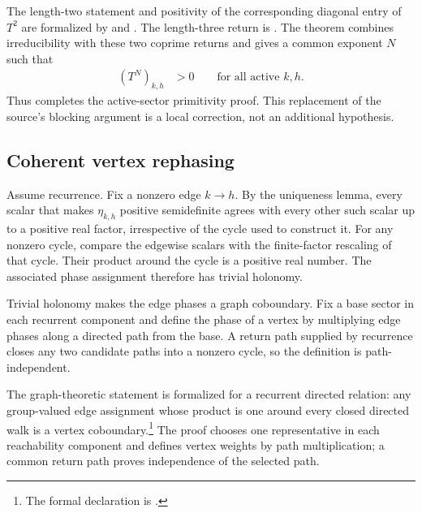 \documentclass{article}
\begin{document}
The length-two statement and positivity of the corresponding diagonal entry
of $T^2$ are formalized by
 and
.
The length-three return is
.
The theorem
combines irreducibility with these two coprime returns and gives a common
exponent $N$ such that
\begin{align}
    (T^N)_{k,h}
        &>0
        \qquad\text{for all active }k,h.
    \label{eq:cpgsv17_mpdo_sal_zcl_eta_local_structure_trace_matrix_primitive_power}
\end{align}
Thus
completes the active-sector primitivity proof. This replacement of the source's
blocking argument is a local correction, not an additional hypothesis.

\subsection{Coherent vertex rephasing}

Assume recurrence. Fix a nonzero edge $k\to h$. By the uniqueness lemma, every
scalar that makes $\eta_{k,h}$ positive semidefinite agrees with every other
such scalar up to a positive real factor, irrespective of the cycle used to
construct it. For any nonzero cycle, compare the edgewise scalars with the
finite-factor rescaling of that cycle. Their product around the cycle is a
positive real number. The associated phase assignment therefore has trivial
holonomy.

Trivial holonomy makes the edge phases a graph coboundary. Fix a base sector in
each recurrent component and define the phase of a vertex by multiplying edge
phases along a directed path from the base. A return path supplied by
recurrence closes any two candidate paths into a nonzero cycle, so the
definition is path-independent.

The graph-theoretic statement is formalized for a recurrent directed relation:
any group-valued edge assignment whose product is one around every closed
directed walk is a vertex coboundary.\footnote{The formal declaration is
.}
The proof chooses one representative in each reachability component and
defines vertex weights by path multiplication; a common return path proves
independence of the selected path.
\end{document}
